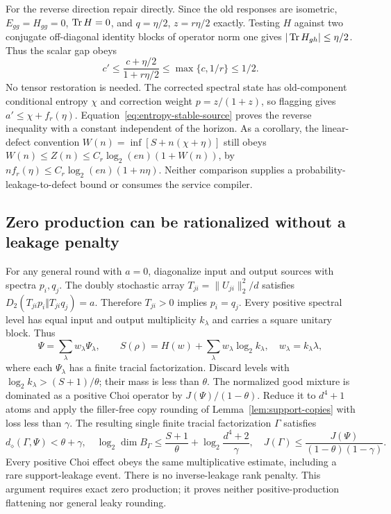 For the reverse direction repair directly. Since the old responses
are isometric, $E_{gg}=H_{gg}=0$, $\operatorname{Tr} H=0$, and
$q=\eta/2$, $z=r\eta/2$ exactly. Testing $H$ against two conjugate
off-diagonal identity blocks of operator norm one gives
$|\operatorname{Tr} H_{gh}|\leq\eta/2$. Thus the scalar gap obeys
\[
 c'\leq\frac{c+\eta/2}{1+r\eta/2}\leq\max\{c,1/r\}\leq1/2.
\]
No tensor restoration is needed. The corrected spectral state has
old-component conditional entropy $\chi$ and correction weight
$p=z/(1+z)$, so flagging gives $a'\leq\chi+f_r(\eta)$.
Equation~\eqref{eq:entropy-stable-source} proves the reverse inequality
with a constant independent of the horizon. As a corollary, the
linear-defect convention $W(n)=\inf[S+n(\chi+\eta)]$ still obeys
$W(n)\leq Z(n)\leq C_r\log_2(en)(1+W(n))$, by
$nf_r(\eta)\leq C_r\log_2(en)(1+n\eta)$.
Neither comparison supplies a probability-leakage-to-defect bound or
consumes the service compiler.

\subsection{Zero production can be rationalized without a leakage penalty}
For any general round with $a=0$, diagonalize input and output sources
with spectra $p_i,q_j$. The doubly stochastic array
$T_{ji}=\|U_{ji}\|_2^2/d$ satisfies
$D_2(T_{ji}p_i\Vert T_{ji}q_j)=a$. Therefore $T_{ji}>0$ implies
$p_i=q_j$. Every positive spectral level has equal input and output
multiplicity $k_\lambda$ and carries a square unitary block. Thus
\[
 \Psi=\sum_\lambda w_\lambda\Psi_\lambda,\qquad
 S(\rho)=H(w)+\sum_\lambda w_\lambda\log_2k_\lambda,
 \quad w_\lambda=k_\lambda\lambda,
\]
where each $\Psi_\lambda$ has a finite tracial factorization.
Discard levels with $\log_2k_\lambda>(S+1)/\theta$; their mass is
less than $\theta$. The normalized good mixture is dominated as a
positive Choi operator by $J(\Psi)/(1-\theta)$.
Reduce it to $d^4+1$ atoms and apply the filler-free copy rounding
of Lemma~\ref{lem:support-copies} with loss less than $\gamma$.
The resulting single finite tracial factorization $\Gamma$ satisfies
\[
 d_\diamond(\Gamma,\Psi)<\theta+\gamma,\quad
 \log_2\dim B_\Gamma\leq\frac{S+1}{\theta}
    +\log_2\frac{d^4+2}{\gamma},\quad
 J(\Gamma)\leq\frac{J(\Psi)}{(1-\theta)(1-\gamma)}.
\]
Every positive Choi effect obeys the same multiplicative estimate,
including a rare support-leakage event. There is no inverse-leakage
rank penalty. This argument requires exact zero production; it proves
neither positive-production flattening nor general leaky rounding.

